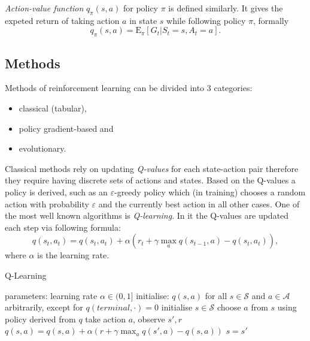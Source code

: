 \emph{Action-value function} $q_\pi(s,a)$ for policy $\pi$ is defined similarly. It gives the expeted return of taking action $a$ in state $s$ while following policy $\pi$, formally
\begin{equation}
    q_\pi(s,a) = \mathrm{E}_\pi[G_t|S_t=s, A_t=a].
\end{equation}\cite{Sutton1998}
\subsection{Methods}
Methods of reinforcement learning can be divided into 3 categories: \begin{itemize}
    \item classical (tabular),
    \item policy gradient-based and
    \item evolutionary.
\end{itemize}

Classical methods rely on updating \emph{Q-values} for each state-action pair therefore they require having discrete sets of actions and states. Based on the Q-values a policy is derived, such as an $\varepsilon$-greedy policy which (in training) chooses a random action with probability $\varepsilon$ and the currently best action in all other cases. One of the most well known algorithms is \emph{Q-learning}. In it the Q-values are updated each step via following formula:
\begin{equation}
    q(s_t,a_t) = q(s_t,a_t) + \alpha \left( r_t+\gamma \max_a q(s_{t-1},a)-q(s_t,a_t)\right), 
\end{equation}
where $\alpha$ is the learning rate.

\begin{algorithm}[h]
    \begin{algorithmic}[1]
    \caption{Q-Learning}
    \label{alg:q-learning}
        \State parameters: learning rate $\alpha \in (0,1]$ 
        \State initialise: $q(s,a)$ for all $s\in\mathcal{S}$ and $a\in \mathcal{A}$ arbitrarily, except for $q(terminal, \cdot) = 0$ 
            \State initialise $s\in\mathcal{S}$
            \Repeat
                \State choose $a$ from $s$ using policy derived from $q$
                \State take action $a$, observe $s', r$
                \State $q(s,a) = q(s,a) + \alpha \left( r+\gamma \max_a q(s',a)-q(s,a)\right)$
                \State $s = s'$
        \EndFor
    \end{algorithmic}
\end{algorithm}

